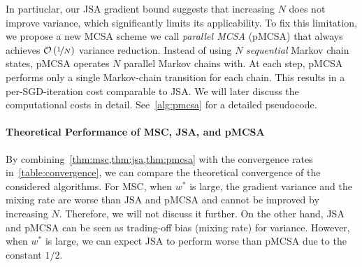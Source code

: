  In partiuclar, our JSA gradient bound suggests that increasing \(N\) does not improve variance, which significantly limits its applicability.
To fix this limitation, we propose a new MCSA scheme we call \textit{parallel MCSA} (pMCSA) that always achieves \(\mathcal{O}\left(\nicefrac{1}{N}\right)\) variance reduction.
Instead of using \(N\) \textit{sequential} Markov chain states, pMCSA operates \(N\) parallel Markov chains with.
At each step, pMCSA performs only a single Markov-chain transition for each chain.
This results in a per-SGD-iteration cost comparable to JSA.
We will later discuss the computational costs in detail.
See~\cref{alg:pmcsa} for a detailed pseudocode.




\vspace{-0.1in}
\paragraph{Theoretical Performance of MSC, JSA, and pMCSA}
By combining~\cref{thm:msc,thm:jsa,thm:pmcsa} with the convergence rates in~\cref{table:convergence}, we can compare the theoretical convergence of the considered algorithms.
For MSC, when \(w^*\) is large, the gradient variance and the mixing rate are worse than JSA and pMCSA and cannot be improved by increasing \(N\).
Therefore, we will not discuss it further.
On the other hand, JSA and pMCSA can be seen as trading-off bias (mixing rate) for variance.
However, when \(w^*\) is large, we can expect JSA to perform worse than pMCSA due to the constant \(1/2\).

\vspace{-0.1in}
